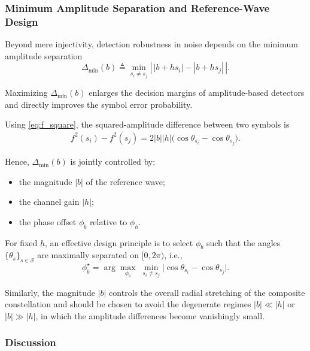 \documentclass[journal]{IEEEtran}
\begin{document}
\subsubsection{Minimum Amplitude Separation and Reference-Wave Design}

Beyond mere injectivity, detection robustness in noise depends on the minimum amplitude separation
\begin{equation}
\Delta_{\min}(b)
\triangleq
\min_{s_i \neq s_j}
\left|
\, |b + h s_i|
-
|b + h s_j|
\,\right|.
\label{eq:delta_min_def}
\end{equation}

Maximizing $\Delta_{\min}(b)$ enlarges the decision margins of amplitude-based detectors and directly improves the symbol error probability.

Using \eqref{eq:f_square}, the squared-amplitude difference between two symbols is
\begin{align}
f^2(s_i)-f^2(s_j)
=
2|b||h|
\Big(
\cos\theta_{s_i}
-
\cos\theta_{s_j}
\Big).
\label{eq:amp_diff}
\end{align}

Hence, $\Delta_{\min}(b)$ is jointly controlled by:

\begin{itemize}
\item the magnitude $|b|$ of the reference wave;
\item the channel gain $|h|$;
\item the phase offset $\phi_b$ relative to $\phi_h$.
\end{itemize}

For fixed $h$, an effective design principle is to select $\phi_b$ such that the angles $\{\theta_s\}_{s\in\mathcal{S}}$ are maximally separated on $[0,2\pi)$, i.e.,
\begin{equation}
\phi_b^{\star}
=
\arg\max_{\phi_b}
\;
\min_{s_i \neq s_j}
\big|
\cos\theta_{s_i}
-
\cos\theta_{s_j}
\big|.
\label{eq:phase_design}
\end{equation}

Similarly, the magnitude $|b|$ controls the overall radial stretching of the composite constellation and should be chosen to avoid the degenerate regimes $|b| \ll |h|$ or $|b| \gg |h|$, in which the amplitude differences become vanishingly small.

\subsubsection{Discussion}
\end{document}
